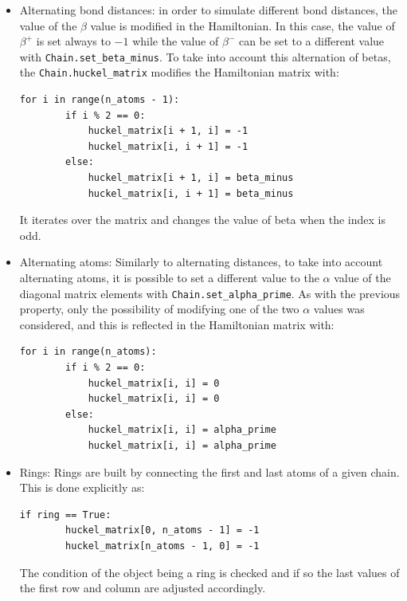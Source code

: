 \documentclass{article}
\begin{document}
\begin{itemize}
    \item Alternating bond distances: in order to simulate different bond distances, the value of the \(\beta\) value is modified in the Hamiltonian. In this case, the value of \(\beta^+\) is set always to \(-1\) while the value of \(\beta^-\) can be set to a different value with \texttt{Chain.set\_beta\_minus}. To take into account this alternation of betas, the \texttt{Chain.huckel\_matrix} modifies the Hamiltonian matrix with:
\begin{lstlisting}[backgroundcolor=\color{LightGray}]
    for i in range(n_atoms - 1):
        if i % 2 == 0:
            huckel_matrix[i + 1, i] = -1 
            huckel_matrix[i, i + 1] = -1
        else:
            huckel_matrix[i + 1, i] = beta_minus
            huckel_matrix[i, i + 1] = beta_minus
\end{lstlisting} 
    It iterates over the matrix and changes the value of beta when the index is odd. 
    \item Alternating atoms: Similarly to alternating distances, to take into account alternating atoms, it is possible to set a different value to the $\alpha$ value of the diagonal matrix elements with \texttt{Chain.set\_alpha\_prime}. As with the previous property, only the possibility of modifying one of the two $\alpha$ values was considered, and this is reflected in the Hamiltonian matrix with:
\begin{lstlisting}[backgroundcolor=\color{LightGray}]
    for i in range(n_atoms):
        if i % 2 == 0:
            huckel_matrix[i, i] = 0
            huckel_matrix[i, i] = 0
        else:
            huckel_matrix[i, i] = alpha_prime
            huckel_matrix[i, i] = alpha_prime
\end{lstlisting} 
    
    \item Rings: Rings are built by connecting the first and last atoms of a given chain. This is done explicitly as:
\begin{lstlisting}[backgroundcolor=\color{LightGray}]
    if ring == True:
        huckel_matrix[0, n_atoms - 1] = -1
        huckel_matrix[n_atoms - 1, 0] = -1
\end{lstlisting} 
The condition of the object being a ring is checked and if so the last values of the first row and column are adjusted accordingly. 
        
\end{itemize}
\end{document}
